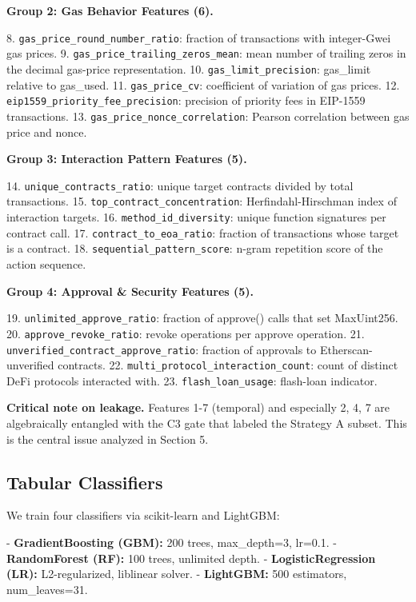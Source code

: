 \documentclass[sigconf,nonacm=false]{acmart}
\begin{document}
\textbf{Group 2: Gas Behavior Features (6).}

8. \texttt{gas\_price\_round\_number\_ratio}: fraction of transactions with integer-Gwei gas prices.
9. \texttt{gas\_price\_trailing\_zeros\_mean}: mean number of trailing zeros in the decimal gas-price representation.
10. \texttt{gas\_limit\_precision}: gas\_limit relative to gas\_used.
11. \texttt{gas\_price\_cv}: coefficient of variation of gas prices.
12. \texttt{eip1559\_priority\_fee\_precision}: precision of priority fees in EIP-1559 transactions.
13. \texttt{gas\_price\_nonce\_correlation}: Pearson correlation between gas price and nonce.

\textbf{Group 3: Interaction Pattern Features (5).}

14. \texttt{unique\_contracts\_ratio}: unique target contracts divided by total transactions.
15. \texttt{top\_contract\_concentration}: Herfindahl-Hirschman index of interaction targets.
16. \texttt{method\_id\_diversity}: unique function signatures per contract call.
17. \texttt{contract\_to\_eoa\_ratio}: fraction of transactions whose target is a contract.
18. \texttt{sequential\_pattern\_score}: n-gram repetition score of the action sequence.

\textbf{Group 4: Approval \& Security Features (5).}

19. \texttt{unlimited\_approve\_ratio}: fraction of approve() calls that set MaxUint256.
20. \texttt{approve\_revoke\_ratio}: revoke operations per approve operation.
21. \texttt{unverified\_contract\_approve\_ratio}: fraction of approvals to Etherscan-unverified contracts.
22. \texttt{multi\_protocol\_interaction\_count}: count of distinct DeFi protocols interacted with.
23. \texttt{flash\_loan\_usage}: flash-loan indicator.

\textbf{Critical note on leakage.} Features 1-7 (temporal) and especially 2, 4, 7 are algebraically entangled with the C3 gate that labeled the Strategy A subset. This is the central issue analyzed in Section 5.

\subsection{Tabular Classifiers}

We train four classifiers via scikit-learn and LightGBM:

- \textbf{GradientBoosting (GBM):} 200 trees, max\_depth=3, lr=0.1.
- \textbf{RandomForest (RF):} 100 trees, unlimited depth.
- \textbf{LogisticRegression (LR):} L2-regularized, liblinear solver.
- \textbf{LightGBM:} 500 estimators, num\_leaves=31.
\end{document}

